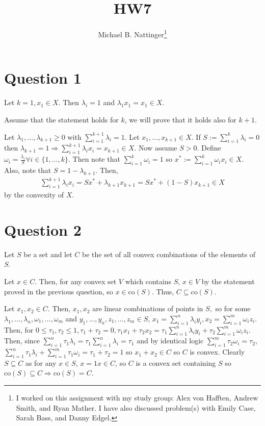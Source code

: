 \documentclass[11pt]{article} %
\title{HW7}
\author{Michael B. Nattinger\footnote{I worked on this assignment with my study group: Alex von Hafften, Andrew Smith, and Ryan Mather. I have also discussed problem(s) with Emily Case, Sarah Bass, and Danny Edgel.}}
\begin{document}
\maketitle

\section{Question 1}
Let $k=1,x_1\in X.$ Then $\lambda_i=1$ and $\lambda_1x_1=x_1\in X.$

Assume that the statement holds for $k$, we will prove that it holds also for $k+1.$

Let $\lambda_1,\dots,\lambda_{k+1} \geq 0$ with $\sum_{i=1}^{k+1}\lambda_i = 1.$ Let $x_1,\dots,x_{k+1} \in X$. If $S := \sum_{i=1}^{k} \lambda_i=0$ then $\lambda_{k+1}=1 \Rightarrow \sum_{i=1}^{k+1} \lambda_i x_i = x_{k+1} \in X$. Now assume $S>0$. Define $\omega_i = \frac{\lambda_i}{S} \forall i \in \{1,\dots,k \}$. Then note that $\sum_{i=1}^k \omega_i = 1$ so $x^{*}:= \sum_{i=1}^k \omega_i x_i \in X$. Also, note that $S = 1-\lambda_{k+1}$. Then,
\begin{align*}
\sum_{i=1}^{k+1} \lambda_i x_i = Sx^{*} + \lambda_{k+1} x_{k+1} = Sx^{*} + (1-S)x_{k+1} \in X
\end{align*}
by the convexity of $X$.

\section{Question 2}

Let $S$ be a set and let $C$ be the set of all convex combinations of the elements of $S$.

Let $x\in C.$ Then, for any convex set $V$ which contains $S$, $x\in V$ by the statement proved in the previous question, so $x \in \text{co}(S)$. Thus, $C\subseteq \text{co}(S)$.

Let $x_1,x_2 \in C.$ Then, $x_1,x_2 $ are linear combinations of points in $S,$ so for some $\lambda_1,\dots,\lambda_n,\omega_1,\dots,\omega_m$ and $y_1,\dots,y_n,z_1,\dots,z_m \in S$, $x_1 = \sum_{i=1}^n\lambda_iy_i, x_2 = \sum_{i=1}^m\omega_iz_i.$ Then, for $0 \leq\tau_1,\tau_2\leq 1,\tau_1+\tau_2=0, \tau_1x_1+\tau_2x_2 =  \tau_1\sum_{i=1}^n\lambda_iy_i + \tau_2\sum_{i=1}^m\omega_iz_i$. Then, since $\sum_{i=1}^n \tau_1\lambda_i = \tau_1\sum_{i=1}^n \lambda_i = \tau_1$ and by identical logic $\sum_{i=1}^m \tau_2\omega_i = \tau_2$, $\sum_{i=1}^n \tau_1\lambda_i + \sum_{i=1}^m \tau_1\omega_i  = \tau_1+\tau_2 = 1$ so $x_1+x_2 \in C$ so $C$ is convex. Clearly $S\subseteq C$ as for any $x\in S$, $x = 1x\in C$, so $C$ is a convex set containing $S$ so $\text{co}(S)\subseteq C \Rightarrow \text{co}(S) = C$.
\end{document}
